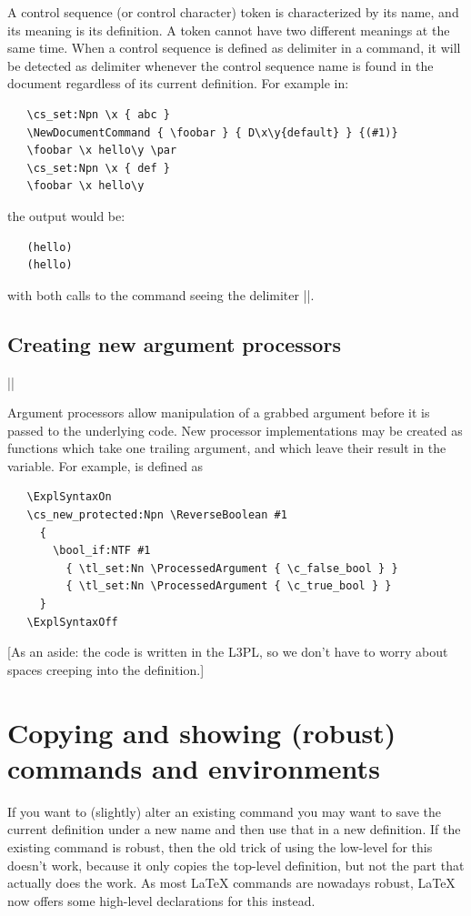 \documentclass{ltxguide}
\begin{document}
A control sequence (or control character) token is characterized by
its name, and its meaning is its definition.
A token cannot have two different meanings at the same time.
When a control sequence is defined as delimiter in a command,
it will be detected as delimiter whenever the control sequence name
is found in the document regardless of its current definition.
For example in:
\begin{verbatim}
   \cs_set:Npn \x { abc }
   \NewDocumentCommand { \foobar } { D\x\y{default} } {(#1)}
   \foobar \x hello\y \par
   \cs_set:Npn \x { def }
   \foobar \x hello\y
\end{verbatim}
the output would be:
\begin{verbatim}
   (hello)
   (hello)
\end{verbatim}
with both calls to the command seeing the delimiter |\x|.

\subsection{Creating new argument processors}

\begin{decl}
  |\ProcessedArgument|
\end{decl}
Argument processors allow manipulation of a grabbed argument before it is
passed to the underlying code. New processor implementations may be created
as functions which take one trailing argument, and which leave their result in
the  variable. For example,  is
defined as
\begin{verbatim}
   \ExplSyntaxOn
   \cs_new_protected:Npn \ReverseBoolean #1
     {
       \bool_if:NTF #1
         { \tl_set:Nn \ProcessedArgument { \c_false_bool } }
         { \tl_set:Nn \ProcessedArgument { \c_true_bool } }
     }
   \ExplSyntaxOff
\end{verbatim}
[As an aside: the code is written in the L3PL, so we don't have to
  worry about spaces creeping into the definition.]

\section{Copying and showing (robust) commands and environments}

If you want to (slightly) alter an existing command you may want to
save the current definition under a new name and then use that in a
new definition. If the existing command is robust, then the old trick of
using the low-level  for this doesn't work, because it only
copies the top-level definition, but not the part that actually does
the work. As most \LaTeX{} commands are nowadays robust, \LaTeX{}
now offers some high-level declarations for this instead.
\end{document}
